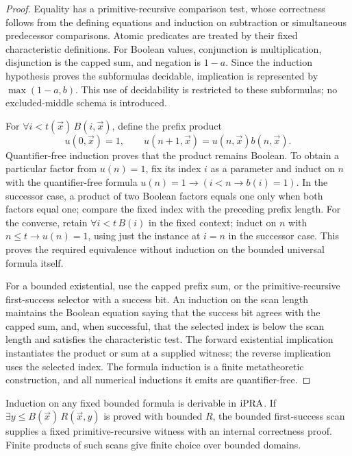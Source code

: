 \begin{proof}
Equality has a primitive-recursive comparison test, whose correctness
follows from the defining equations and induction on subtraction or
simultaneous predecessor comparisons. Atomic predicates are treated by
their fixed characteristic definitions. For Boolean values, conjunction
is multiplication, disjunction is the capped sum, and negation is
\(1-a\). Since the induction hypothesis proves the subformulas
decidable, implication is represented by
\(\max(1-a,b)\). This use of decidability is restricted to these
subformulas; no excluded-middle schema is introduced.

For \(\forall i<t(\vec x)\,B(i,\vec x)\), define the prefix product
\[
 u(0,\vec x)=1,\qquad
 u(n+1,\vec x)=u(n,\vec x)b(n,\vec x).
\]
Quantifier-free induction proves that the product remains Boolean.
To obtain a particular factor from \(u(n)=1\), fix its index \(i\)
as a parameter and induct on \(n\) with the quantifier-free formula
\(u(n)=1\to(i<n\to b(i)=1)\). In the successor case, a product
of two Boolean factors equals one only when both factors equal one;
compare the fixed index with the preceding prefix length.
For the converse, retain \(\forall i<t\,B(i)\) in the fixed context;
induct on \(n\) with \(n\le t\to u(n)=1\), using just the instance
at \(i=n\) in the successor case. This proves the required equivalence
without induction on the bounded universal formula itself.

For a bounded existential, use the capped prefix sum, or the
primitive-recursive first-success selector with a success bit. An
induction on the scan length maintains the Boolean equation saying
that the success bit agrees with the capped sum, and, when successful,
that the selected index is below the scan length and satisfies the
characteristic test. The forward existential implication instantiates
the product or sum at a supplied witness; the reverse implication uses
the selected index. The formula induction is a finite metatheoretic
construction, and all numerical inductions it emits are quantifier-free.
\end{proof}

\begin{corollary}
\label{cor:bounded}
Induction on any fixed bounded formula is derivable in \(\mathrm{iPRA}\).
If \(\exists y\le B(\vec x)\,R(\vec x,y)\) is proved with bounded
\(R\), the bounded first-success scan supplies a fixed
primitive-recursive witness with an internal correctness proof.
Finite products of such scans give finite choice over bounded domains.
\end{corollary}

